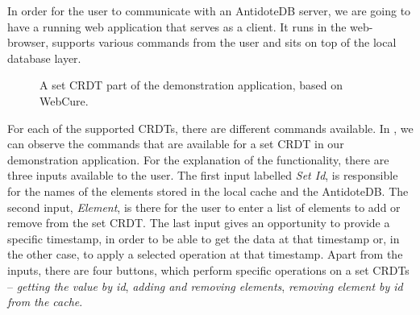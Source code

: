 In order for the user to communicate with an AntidoteDB server, we are going to have a running web application that serves as a client. It runs in the web-browser, supports various commands from the user and sits on top of the local database layer.

\begin{figure}[!htb]
    \begin{center}
    \setlength{\fboxsep}{4pt}%
    \setlength{\fboxrule}{1pt}%
    {\scriptsize}
    \caption {A set CRDT part of the demonstration application, based on WebCure.}
    \label{fig:dev2}
\end{center}
\end{figure}
 

For each of the supported CRDTs, there are different commands available. In , we can observe the commands that are available for a set CRDT in our demonstration application. For the explanation of the functionality, there are three inputs available to the user. The first input labelled \textit{Set Id}, is responsible for the names of the elements stored in the local cache and the AntidoteDB. The second input, \textit{Element}, is there for the user to enter a list of elements to add or remove from the set CRDT. The last input gives an opportunity to provide a specific timestamp, in order to be able to get the data at that timestamp or, in the other case, to apply a selected operation at that timestamp. Apart from the inputs, there are four buttons, which perform specific operations on a set CRDTs -- \textit{getting the value by id}, \textit{adding and removing elements}, \textit{removing element by id from the cache}.

